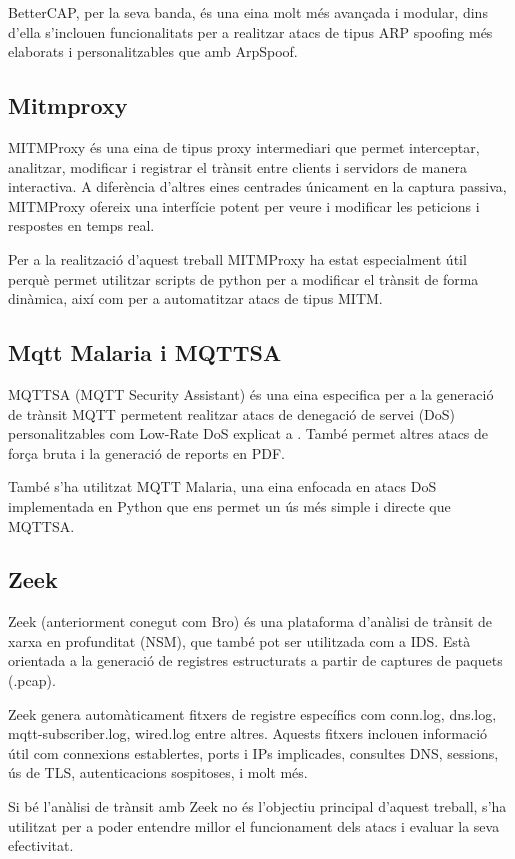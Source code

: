    BetterCAP, per la seva banda, és una eina molt més avançada i modular, dins d'ella s'inclouen funcionalitats per a realitzar atacs de tipus ARP spoofing més elaborats i personalitzables que amb ArpSpoof.

    \subsection{Mitmproxy}
    \label{sec:MITMProxy}
    MITMProxy és una eina de tipus proxy intermediari que permet interceptar, analitzar, modificar i registrar el trànsit entre clients i servidors de manera interactiva. A diferència d'altres eines centrades únicament en la captura passiva, MITMProxy ofereix una interfície potent per veure i modificar les peticions i respostes en temps real.

    Per a la realització d'aquest treball MITMProxy ha estat especialment útil perquè permet utilitzar scripts de python per a modificar el trànsit de forma dinàmica, així com per a automatitzar atacs de tipus MITM. \cite{mitmproxyexp}

    \subsection{Mqtt Malaria i MQTTSA}
    \label{sec:MQTTSA}
    MQTTSA (MQTT Security Assistant) és una eina especifica per a la generació de trànsit MQTT permetent realitzar atacs de denegació de servei (DoS) personalitzables com Low-Rate DoS explicat a \cite{lowrateDDoSexp}. També permet altres atacs de força bruta i la generació de reports en PDF. \cite{mqttsaexp}

    També s'ha utilitzat MQTT Malaria, una eina enfocada en atacs DoS implementada en Python que ens permet un ús més simple i directe que MQTTSA. \cite{mqttmalaria}
    
    \subsection{Zeek}
    \label{sec:Zeek}
    Zeek (anteriorment conegut com Bro) és una plataforma d’anàlisi de trànsit de xarxa en profunditat (NSM), que també pot ser utilitzada com a IDS. Està orientada a la generació de registres estructurats a partir de captures de paquets (.pcap). \cite{zeekexp}

    Zeek genera automàticament fitxers de registre específics com conn.log, dns.log, mqtt-subscriber.log, wired.log entre altres. Aquests fitxers inclouen informació útil com connexions establertes, ports i IPs implicades, consultes DNS, sessions, ús de TLS, autenticacions sospitoses, i molt més.

    Si bé l'anàlisi de trànsit amb Zeek no és l'objectiu principal d'aquest treball, s'ha utilitzat per a poder entendre millor el funcionament dels atacs i evaluar la seva efectivitat.
